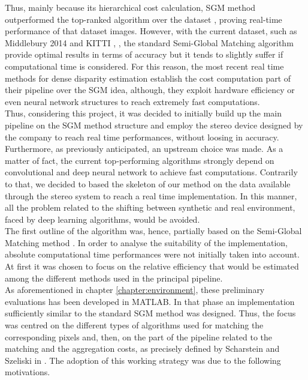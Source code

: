 Thus, mainly because its hierarchical cost calculation, SGM method outperformed the top-ranked algorithm over the dataset \cite{scharstein2003high}, proving real-time performance of that dataset images. 
However, with the current dataset, such as Middlebury 2014 \cite{Scharstein2014} and KITTI \cite{geiger2013vision}, \cite{menze2015object}, the standard Semi-Global Matching algorithm provide optimal results in terms of accuracy but it tends to slightly suffer if computational time is considered.
For this reason, the most recent real time methods for dense disparity estimation establish the cost computation part of their pipeline over the SGM idea, although, they exploit hardware efficiency or even neural network structures to reach extremely fast computations.\\
Thus, considering this project, it was decided to initially build up the main pipeline on the SGM method structure and employ the stereo device designed by the company to reach real time performances, without loosing in accuracy. 
Furthermore, as previously anticipated, an upstream choice was made. 
As a matter of fact, the current top-performing algorithms strongly depend on convolutional and deep neural network to achieve fast computations.
Contrarily to that, we decided to based the skeleton of our method on the data available through the stereo system to reach a real time implementation.
In this manner, all the problem related to the shifting between synthetic and real environment, faced by deep learning algorithms, would be avoided. \\
The first outline of the algorithm was, hence, partially based on the Semi-Global Matching method \cite{Hirschmuller2008}. 
In order to analyse the suitability of the implementation, absolute computational time performances were not initially taken into account. 
At first it was chosen to focus on the relative efficiency that would be estimated among the different methods used in the principal pipeline.\\
As aforementioned in chapter \ref{chapter:environment}, these preliminary evaluations has been developed in MATLAB. 
In that phase an implementation sufficiently similar to the standard SGM method was designed. 
Thus, the focus was centred on the different types of algorithms used for matching the corresponding pixels and, then, on the part of the pipeline related to the matching and the aggregation costs, as precisely defined by Scharstein and Szeliski in \cite{Scharstein2001}.
The adoption of this working strategy was due to the following motivations. 
